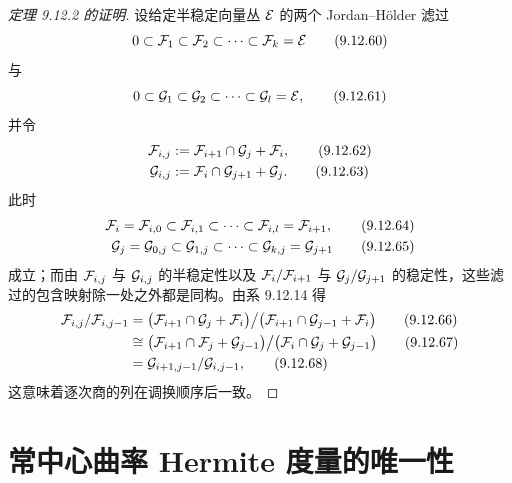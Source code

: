\begin{proof}[定理 9.12.2 的证明]
  设给定半稳定向量丛 $\mathcal{E}$ 的两个 Jordan--Hölder 滤过
  \begin{equation}
    0\subset\mathcal{F}_1\subset\mathcal{F}_2\subset\cdots\subset\mathcal{F}_k=\mathcal{E}
    \tag{9.12.60}
  \end{equation}
  与
  \begin{equation}
    0\subset\mathcal{G}_1\subset\mathcal{G}_2\subset\cdots\subset\mathcal{G}_l=\mathcal{E},
    \tag{9.12.61}
  \end{equation}
  并令
  \begin{align}
    \mathcal{F}_{i,j}&:=\mathcal{F}_{i+1}\cap\mathcal{G}_j+\mathcal{F}_i, \tag{9.12.62}\\
    \mathcal{G}_{i,j}&:=\mathcal{F}_i\cap\mathcal{G}_{j+1}+\mathcal{G}_j. \tag{9.12.63}
  \end{align}
  此时
  \begin{align}
    \mathcal{F}_i=\mathcal{F}_{i,0}\subset\mathcal{F}_{i,1}\subset\cdots\subset\mathcal{F}_{i,l}=\mathcal{F}_{i+1}, \tag{9.12.64}\\
    \mathcal{G}_j=\mathcal{G}_{0,j}\subset\mathcal{G}_{1,j}\subset\cdots\subset\mathcal{G}_{k,j}=\mathcal{G}_{j+1} \tag{9.12.65}
  \end{align}
  成立；而由 $\mathcal{F}_{i,j}$ 与 $\mathcal{G}_{i,j}$ 的半稳定性以及 $\mathcal{F}_i/\mathcal{F}_{i+1}$ 与 $\mathcal{G}_j/\mathcal{G}_{j+1}$ 的稳定性，这些滤过的包含映射除一处之外都是同构。由系 9.12.14 得
  \begin{align}
    \mathcal{F}_{i,j}/\mathcal{F}_{i,j-1}
    &=\bigl(\mathcal{F}_{i+1}\cap\mathcal{G}_j+\mathcal{F}_i\bigr)\big/\bigl(\mathcal{F}_{i+1}\cap\mathcal{G}_{j-1}+\mathcal{F}_i\bigr) \tag{9.12.66}\\
    &\cong\bigl(\mathcal{F}_{i+1}\cap\mathcal{F}_j+\mathcal{G}_{j-1}\bigr)\big/\bigl(\mathcal{F}_i\cap\mathcal{G}_j+\mathcal{G}_{j-1}\bigr) \tag{9.12.67}\\
    &=\mathcal{G}_{i+1,j-1}/\mathcal{G}_{i,j-1}, \tag{9.12.68}
  \end{align}
  这意味着逐次商的列在调换顺序后一致。
\end{proof}


\section{常中心曲率 Hermite 度量的唯一性}

